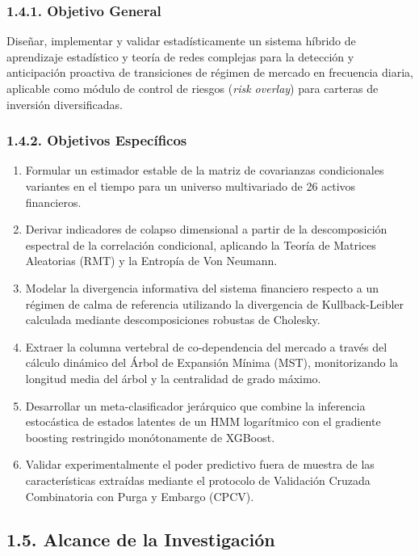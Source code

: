 \documentclass[
  12pt,
]{article}
\providecommand{\tightlist}{%
  \setlength{\itemsep}{0pt}\setlength{\parskip}{0pt}}
\begin{document}
\subsubsection{1.4.1. Objetivo General}\label{objetivo-general}

Diseñar, implementar y validar estadísticamente un sistema híbrido de
aprendizaje estadístico y teoría de redes complejas para la detección y
anticipación proactiva de transiciones de régimen de mercado en
frecuencia diaria, aplicable como módulo de control de riesgos
(\emph{risk overlay}) para carteras de inversión diversificadas.

\subsubsection{1.4.2. Objetivos
Específicos}\label{objetivos-especuxedficos}

\begin{enumerate}
\def\labelenumi{\arabic{enumi}.}
\tightlist
\item
  Formular un estimador estable de la matriz de covarianzas
  condicionales variantes en el tiempo para un universo multivariado de
  26 activos financieros.
\item
  Derivar indicadores de colapso dimensional a partir de la
  descomposición espectral de la correlación condicional, aplicando la
  Teoría de Matrices Aleatorias (RMT) y la Entropía de Von Neumann.
\item
  Modelar la divergencia informativa del sistema financiero respecto a
  un régimen de calma de referencia utilizando la divergencia de
  Kullback-Leibler calculada mediante descomposiciones robustas de
  Cholesky.
\item
  Extraer la columna vertebral de co-dependencia del mercado a través
  del cálculo dinámico del Árbol de Expansión Mínima (MST),
  monitorizando la longitud media del árbol y la centralidad de grado
  máximo.
\item
  Desarrollar un meta-clasificador jerárquico que combine la inferencia
  estocástica de estados latentes de un HMM logarítmico con el gradiente
  boosting restringido monótonamente de XGBoost.
\item
  Validar experimentalmente el poder predictivo fuera de muestra de las
  características extraídas mediante el protocolo de Validación Cruzada
  Combinatoria con Purga y Embargo (CPCV).
\end{enumerate}

\subsection{1.5. Alcance de la
Investigación}\label{alcance-de-la-investigaciuxf3n}
\end{document}
